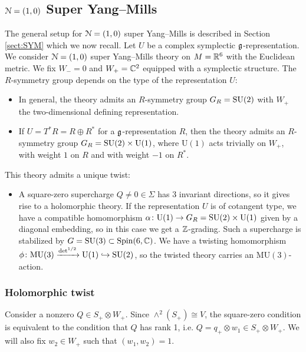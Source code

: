 \documentclass[10pt, oneside]{article}
\newcommand{\MU}{\mathrm{MU}}
\renewcommand{\U}{\mathrm{U}}
\begin{document}
\subsection{\texorpdfstring{$\mathcal N=(1, 0)$}{N=(1, 0)} Super Yang--Mills}

The general setup for $\mathcal N=(1, 0)$ super Yang--Mills is described in Section \ref{sect:SYM} which we now recall. Let $U$ be a complex symplectic $\mathfrak g$-representation. We consider $\mathcal N=(1, 0)$ super Yang--Mills theory on $M=\mathbb R^6$ with the Euclidean metric. We fix $W_- = 0$ and $W_+=\mathbb C^2$ equipped with a symplectic structure. The $R$-symmetry group depends on the type of the representation $U$:
\begin{itemize}
\item In general, the theory admits an $R$-symmetry group $G_R=\mathrm{SU}(2)$ with $W_+$ the two-dimensional defining representation.

\item If $U = T^* R=R\oplus R^*$ for a $\mathfrak g$-representation $R$, then the theory admits an $R$-symmetry group $G_R=\SU(2)\times \U(1)$, where $\U(1)$ acts trivially on $W_+$, with weight $1$ on $R$ and with weight $-1$ on $R^*$.
\end{itemize}

This theory admits a unique twist:
\begin{itemize}
\item A square-zero supercharge $Q\neq 0\in\Sigma$ has 3 invariant directions, so it gives rise to a holomorphic theory. If the representation $U$ is of cotangent type, we have a compatible homomorphism $\alpha\colon \U(1)\rightarrow G_R=\SU(2)\times \U(1)$ given by a diagonal embedding, so in this case we get a $\mathbb Z$-grading. Such a supercharge is stabilized by $G=\mathrm{SU}(3)\subset \mathrm{Spin}(6, \mathbb C)$. We have a twisting homomorphism $\phi\colon\MU(3)\xrightarrow{\det^{1/2}}\U(1)\hookrightarrow \SU(2)$, so the twisted theory carries an $\MU(3)$-action.
\end{itemize}

\subsubsection{Holomorphic twist}
\label{sect:6dholomorphictwist}

Consider a nonzero $Q\in S_+\otimes W_+$. Since $\wedge^2(S_+)\cong V$, the square-zero condition is equivalent to the condition that $Q$ has rank 1, i.e. $Q=q_+\otimes w_1\in S_+\otimes W_+$. We will also fix $w_2\in W_+$ such that $(w_1, w_2) = 1$.
\end{document}
